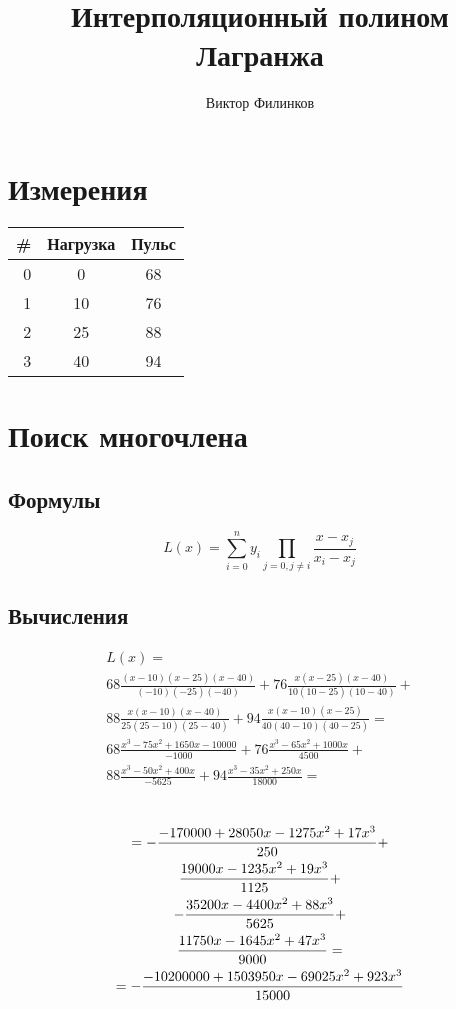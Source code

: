 \documentclass[oneside,final,14pt]{extreport}
\begin{document}
\title{Интерполяционный полином Лагранжа}
\author{Виктор Филинков}
\maketitle

\chapter*{Измерения}
\begin{table}[pht]
	\centering
	\begin{tabular}{|r | c | c|}
		\hline \textbf{\#} &  \textbf{Нагрузка} & \textbf{Пульс} \\ \hline
		0 & 0	&	68	\\ \hline
		1 & 10	&	76	\\ \hline
		2 & 25	&	88	\\ \hline
		3 & 40	&	94	\\ \hline
	\end{tabular}
	\label{measurements}
\end{table}

\chapter*{Поиск многочлена}
\section*{Формулы}

\[
	L(x)=\sum_{i=0}^{n} y_i \prod_{j = 0, j \ne i} \frac{x-x_j}{x_i-x_j}
\]

\section*{Вычисления}
\begin{multline*}
	L(x)= \\
	68 \frac{(x-10)(x-25)(x-40)}{(-10) (-25) (-40)} + 
	76 \frac{x(x-25)(x-40)}{10(10-25)(10-40)} + \\
	88 \frac{x(x-10)(x-40)}{25(25-10)(25-40)} +
	94 \frac{x(x-10)(x-25)}{40(40-10)(40-25)} = \\
	68 \frac{x^3-75x^2+1650x-10000}{-1000} +
	76 \frac{x^3-65x^2+1000x}{4500} + \\
	88 \frac{x^3-50x^2+400x}{-5625} +
	94 \frac{x^3-35x^2+250x}{18000} = \\
\end{multline*}
\begin{multline*}
\\
= -{{-170000+28050x-1275x^2+17x^3}\over{250}} + \\
{{19000x-1235x^2+19x^3}\over{1125}} + \\
-{{35200x-4400x^2+88x^3}\over{5625}} + \\
{{11750x-1645x^2+47x^3}\over{9000}} = \\
= -{{-10200000+1503950x-69025x^2+923x^3}\over{15000}} \\
\end{multline*}
\end{document}

